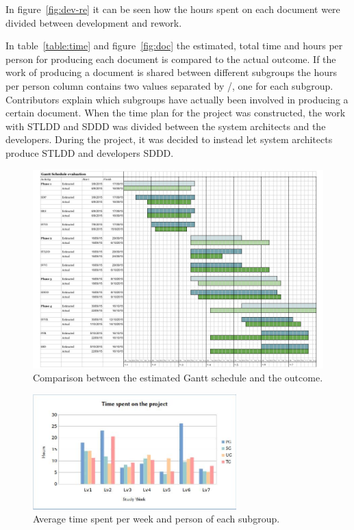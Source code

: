 \documentclass[a4paper]{article}
\begin{document}
In figure~\ref{fig:dev-re} it can be seen how the hours spent on each document were divided between development and rework. 

In table~\ref{table:time} and figure~\ref{fig:doc} the estimated, total time and hours per person for producing each document is compared to the actual outcome. If the work of producing a document is shared between different subgroups the hours per person column contains two values separated by /, one for each subgroup. Contributors explain which subgroups have actually been involved in producing a certain document. When the time plan for the project was constructed, the work with STLDD and SDDD was divided between the system architects and the developers. During the project, it was decided to instead let system architects produce STLDD and developers SDDD. 

\begin{figure}[h!]
\includegraphics[width=1.1\textwidth]{gantt.jpg}
\caption{Comparison between the estimated Gantt schedule and the outcome.}
\label{fig:gantt}
\end{figure}

\begin{figure}[h!]
\centering
\includegraphics[width=0.7\textwidth]{time.jpg}
\caption{Average time spent per week and person of each subgroup.}
\label{fig:time}
\end{figure}
\end{document}
